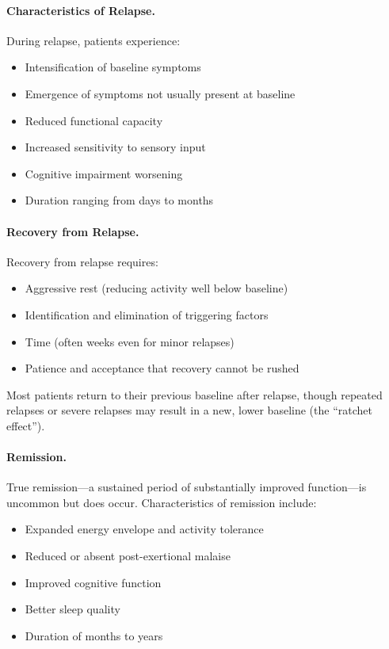 \paragraph{Characteristics of Relapse.}
During relapse, patients experience:
\begin{itemize}
    \item Intensification of baseline symptoms
    \item Emergence of symptoms not usually present at baseline
    \item Reduced functional capacity
    \item Increased sensitivity to sensory input
    \item Cognitive impairment worsening
    \item Duration ranging from days to months
\end{itemize}

\paragraph{Recovery from Relapse.}
Recovery from relapse requires:
\begin{itemize}
    \item Aggressive rest (reducing activity well below baseline)
    \item Identification and elimination of triggering factors
    \item Time (often weeks even for minor relapses)
    \item Patience and acceptance that recovery cannot be rushed
\end{itemize}

Most patients return to their previous baseline after relapse, though repeated relapses or severe relapses may result in a new, lower baseline (the ``ratchet effect'').

\paragraph{Remission.}
True remission---a sustained period of substantially improved function---is uncommon but does occur. Characteristics of remission include:
\begin{itemize}
    \item Expanded energy envelope and activity tolerance
    \item Reduced or absent post-exertional malaise
    \item Improved cognitive function
    \item Better sleep quality
    \item Duration of months to years
\end{itemize}


